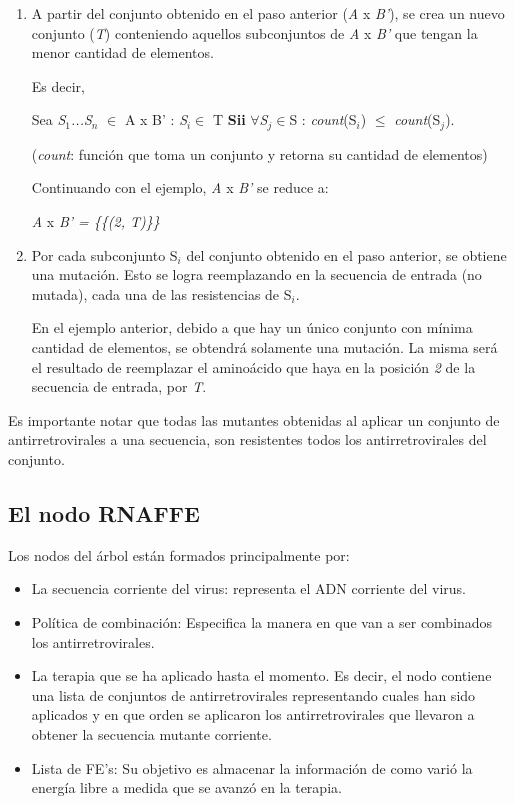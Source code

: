 \begin{enumerate}
    \item  A partir del conjunto obtenido en el paso anterior (\emph{A} x \emph{B'}), se crea un nuevo conjunto (\emph{T}) conteniendo aquellos 
      subconjuntos de \emph{A} x \emph{B'} que tengan la menor cantidad de elementos.

   Es decir, 
   \begin{center}
     Sea \emph{S$_{1}$...S$_{n}$} $\in$ A x B' : \emph{S}$_{i}\in$ T \textbf{Sii} $\forall$\emph{S}$_{j}\in$S : \emph{count}(S$_{i}$) $\leq$ \emph{count}(S$_{j}$).
   \end{center}
   \vspace{-.33cm}
   \scriptsize{(\textit{count}: funci\'on que toma un conjunto y retorna su cantidad de elementos)}

   \normalsize{}Continuando con el ejemplo, \emph{A} x \emph{B'} se reduce a:
   \begin{center}
     \emph{A} x \emph{B' = \{\{(2, T)\}\}}
   \end{center}

  \item  Por cada subconjunto S$_{i}$ del conjunto obtenido en el paso anterior, se obtiene una mutaci\'on. Esto se logra reemplazando en la 
    secuencia de entrada (no mutada), cada una de las resistencias de S$_{i}$.

    En el ejemplo anterior, debido a que hay un \'unico conjunto con m\'inima cantidad de elementos, se obtendr\'a solamente una mutaci\'on. La misma 
    ser\'a el resultado de reemplazar el amino\'acido que haya en la posici\'on \emph{2} de la secuencia de entrada, por \emph{T}.
\end{enumerate}

  Es importante notar que todas las mutantes obtenidas al aplicar un conjunto de antirretrovirales a una secuencia, son resistentes todos los
  antirretrovirales del conjunto.

\subsection{El nodo RNAFFE}
  Los nodos del \'arbol est\'an formados principalmente por:
 \begin{itemize}
  \item La secuencia corriente del virus: representa el ADN corriente del virus.
  \item Pol\'itica de combinaci\'on: Especifica la manera en que van a ser combinados los antirretrovirales.
  \item La terapia que se ha aplicado hasta el momento. Es decir, el nodo contiene una lista de conjuntos de antirretrovirales representando cuales
    han sido aplicados y en que orden se aplicaron los antirretrovirales que llevaron a obtener la secuencia mutante corriente.
  \item Lista de FE's: Su objetivo es almacenar la informaci\'on de como vari\'o la energ\'ia libre a medida que se avanz\'o en la terapia.
 \end{itemize}

